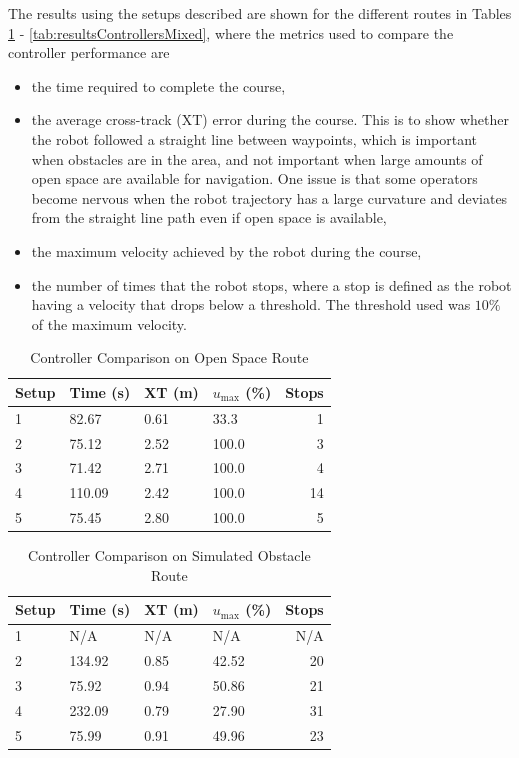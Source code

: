 The results using the setups described are shown for the different routes in Tables \ref{tab:resultsControllersOpenSpace} - \ref{tab:resultsControllersMixed}, where the metrics used to compare the controller performance are
\begin{itemize}
\item the time required to complete the course,
\item the average cross-track (XT) error during the course. This is to show whether the robot followed a straight line between waypoints, which is important when obstacles are in the area, and not important when large amounts of open space are available for navigation. One issue is that some operators become nervous when the robot trajectory has a large curvature and deviates from the straight line path even if open space is available,
\item the maximum velocity achieved by the robot during the course,
\item the number of times that the robot stops, where a stop is defined as the robot having a velocity that drops below a threshold. The threshold used was $10\%$ of the maximum velocity.
\end{itemize}

\begin{table}[ht!]
\caption{Controller Comparison on Open Space Route}
\small
\centering
\begin{tabular}{@{}llllr@{}} \toprule
Setup & Time (s) & XT (m) & $u_{\text{max}}$ (\%) & Stops \\ \midrule
1     & 82.67    & 0.61   & 33.3                  & 1     \\
2     & 75.12    & 2.52   & 100.0                 & 3     \\
3     & 71.42    & 2.71   & 100.0                 & 4     \\
4     & 110.09   & 2.42   & 100.0                 & 14    \\
5     & 75.45    & 2.80   & 100.0                 & 5     \\ \bottomrule
\end{tabular}
\label{tab:resultsControllersOpenSpace}
\end{table}

\begin{table}[ht!]
\caption{Controller Comparison on Simulated Obstacle Route}
\small
\centering
\begin{tabular}{@{}llllr@{}} \toprule
Setup & Time (s) & XT (m) & $u_{\text{max}}$ (\%) & Stops \\ \midrule
1     & N/A      & N/A    & N/A                   & N/A   \\
2     & 134.92   & 0.85   & 42.52                 & 20    \\
3     & 75.92    & 0.94   & 50.86                 & 21    \\
4     & 232.09   & 0.79   & 27.90                 & 31    \\
5     & 75.99    & 0.91   & 49.96                 & 23    \\ \bottomrule
\end{tabular}
\label{tab:resultsControllersObstacles}
\end{table}

